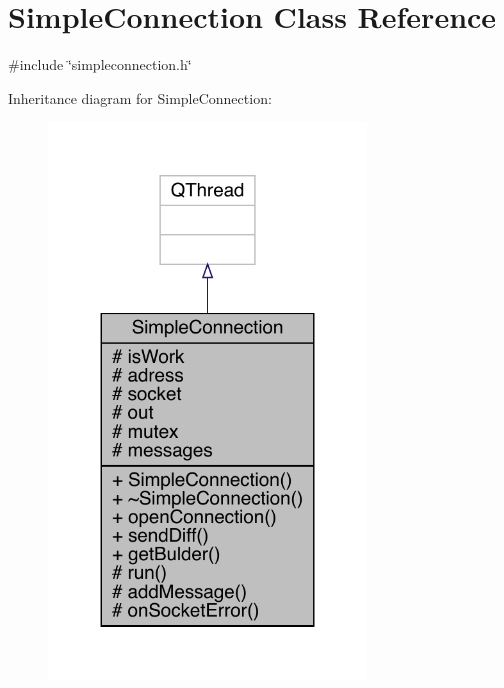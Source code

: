 \hypertarget{a00125}{}\section{Simple\+Connection Class Reference}
\label{a00125}


{\ttfamily \#include \char`\"{}simpleconnection.\+h\char`\"{}}



Inheritance diagram for Simple\+Connection\+:
\nopagebreak
\begin{figure}[H]
\begin{center}
\leavevmode
\includegraphics[width=239pt]{da/d72/a00124}
\end{center}
\end{figure}


